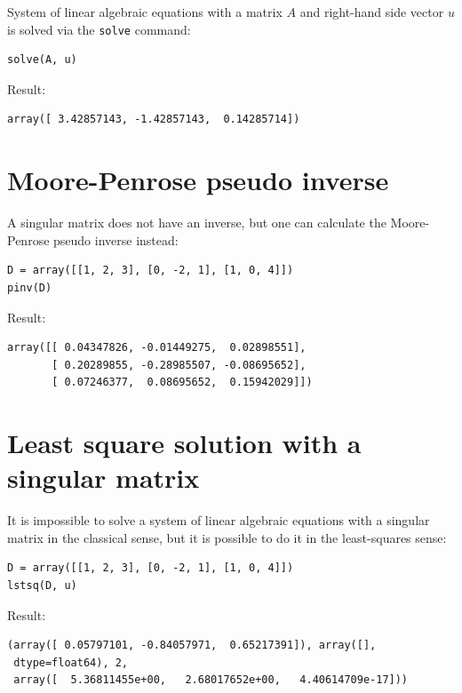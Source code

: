 \documentclass{article}
\begin{document}
System of linear algebraic equations with a matrix $A$ and right-hand 
side vector $u$ is solved via the {\tt solve} command:
\begin{verbatim}
solve(A, u)
\end{verbatim}
Result:
\begin{verbatim}
array([ 3.42857143, -1.42857143,  0.14285714])
\end{verbatim}



\section{Moore-Penrose pseudo inverse}

A singular matrix does not have an inverse, but one can calculate the Moore-Penrose
pseudo inverse instead:
\begin{verbatim}
D = array([[1, 2, 3], [0, -2, 1], [1, 0, 4]])
pinv(D)
\end{verbatim}
Result:
\begin{verbatim}
array([[ 0.04347826, -0.01449275,  0.02898551],
       [ 0.20289855, -0.28985507, -0.08695652],
       [ 0.07246377,  0.08695652,  0.15942029]])
\end{verbatim}

\section{Least square solution with a singular matrix}

It is impossible to solve a system of linear algebraic equations with a singular
matrix in the classical sense, but it is possible to do it in the least-squares
sense:
\begin{verbatim}
D = array([[1, 2, 3], [0, -2, 1], [1, 0, 4]])
lstsq(D, u)
\end{verbatim}
Result:
\begin{verbatim}
(array([ 0.05797101, -0.84057971,  0.65217391]), array([], 
 dtype=float64), 2, 
 array([  5.36811455e+00,   2.68017652e+00,   4.40614709e-17]))
\end{verbatim}


\end{document}
